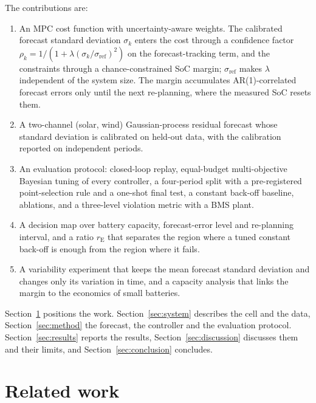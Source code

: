 \documentclass[a4paper,fleqn]{cas-dc}
\newcommand{\rE}{r_{\mathrm{E}}}
\begin{document}
The contributions are:
\begin{enumerate}
\item An MPC cost function with uncertainty-aware weights. The calibrated forecast standard deviation $\sigma_k$ enters the cost through a confidence factor $\rho_k=1/(1+\lambda(\sigma_k/\sigma_{\mathrm{ref}})^2)$ on the forecast-tracking term, and the constraints through a chance-constrained SoC margin; $\sigma_{\mathrm{ref}}$ makes $\lambda$ independent of the system size. The margin accumulates AR(1)-correlated forecast errors only until the next re-planning, where the measured SoC resets them.
\item A two-channel (solar, wind) Gaussian-process residual forecast whose standard deviation is calibrated on held-out data, with the calibration reported on independent periods.
\item An evaluation protocol: closed-loop replay, equal-budget multi-objective Bayesian tuning of every controller, a four-period split with a pre-registered point-selection rule and a one-shot final test, a constant back-off baseline, ablations, and a three-level violation metric with a BMS plant.
\item A decision map over battery capacity, forecast-error level and re-planning interval, and a ratio $\rE$ that separates the region where a tuned constant back-off is enough from the region where it fails.
\item A variability experiment that keeps the mean forecast standard deviation and changes only its variation in time, and a capacity analysis that links the margin to the economics of small batteries.
\end{enumerate}

Section~\ref{sec:related} positions the work. Section~\ref{sec:system} describes the cell and the data, Section~\ref{sec:method} the forecast, the controller and the evaluation protocol. Section~\ref{sec:results} reports the results, Section~\ref{sec:discussion} discusses them and their limits, and Section~\ref{sec:conclusion} concludes.

\section{Related work}\label{sec:related}
\end{document}
